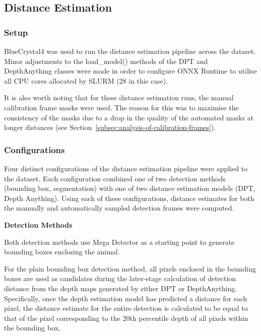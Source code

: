 \subsection{Distance Estimation}

\subsubsection{Setup}

BlueCrystal4 was used to run the distance estimation pipeline across the dataset.
Minor adjustments to the load\_model() methods of the DPT and DepthAnything classes
were made in order to configure ONNX Runtime to utilise all CPU cores allocated by
SLURM (28 in this case).

It is also worth noting that for these distance estimation runs, the manual calibration
frame masks were used.
The reason for this was to maximise the consistency of the masks due to a drop in the
quality of the automated masks at longer distances
(see Section~\ref{subsec:analysis-of-calibration-frames}).

\subsubsection{Configurations}\label{subsubsec:configuratons}

Four distinct configurations of the distance estimation pipeline were applied to the
dataset.
Each configuration combined one of two detection methods (bounding box, segmentation) with one
of two distance estimation models (DPT, Depth Anything).
Using each of these configurations, distance estimates for both the manually and automatically
sampled detection frames were computed.

\vspace{5mm}
\textbf{Detection Methods}

Both detection methods use Mega Detector as a starting point to generate bounding boxes
enclosing the animal.

For the plain bounding box detection method, all pixels enclosed in the bounding boxes are used
as candidates during the later-stage calculation of detection distance from the depth maps
generated by either DPT or DepthAnything.
Specifically, once the depth estimation model has predicted a distance for each pixel, the
distance estimate for the entire detection is calculated to be equal to that of the pixel
corresponding to the 20th percentile depth of all pixels within the bounding box.

